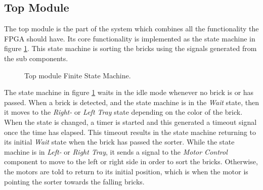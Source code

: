 
\subsection{Top Module}
The top module is the part of the system which combines all the functionality the FPGA should have.
Its core functionality is implemented as the state machine in figure \ref{fig:topmodule_fsm}.
This state machine is sorting the bricks using the signals generated from the sub components.


\begin{figure}[H]
\centering
{}

\caption{Top module Finite State Machine.}
\label{fig:topmodule_fsm}
\end{figure}


The state machine in figure \ref{fig:topmodule_fsm} waits in the idle mode whenever no brick is or has passed.
When a brick is detected, and the state machine is in the \textit{Wait} state, then it moves to the \textit{Right-} or \textit{Left Tray} state depending on the color of the brick.
When the state is changed, a timer is started and this generated a timeout signal once the time has elapsed.
This timeout results in the state machine returning to its initial \textit{Wait} state when the brick has passed the sorter.
While the state machine is in \textit{Left-} or \textit{Right Tray}, it sends a signal to the \textit{Motor Control} component to move to the left or right side in order to sort the bricks.
Otherwise, the motors are told to return to its initial position, which is when the motor is pointing the sorter towards the falling bricks.



